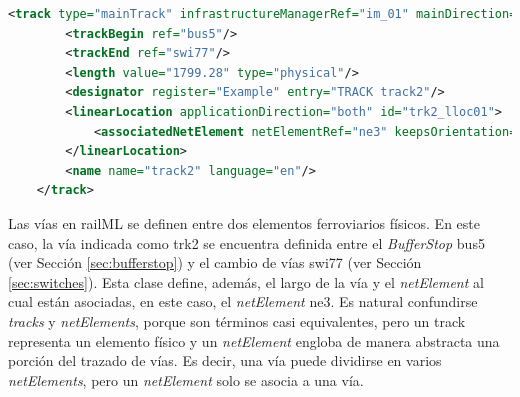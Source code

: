     \begin{lstlisting}[language = XML, caption = Clase \textit{Track} , label = {lst:track}]
    <track type="mainTrack" infrastructureManagerRef="im_01" mainDirection="both" id="trk2">
        <trackBegin ref="bus5"/>
        <trackEnd ref="swi77"/>
        <length value="1799.28" type="physical"/>
        <designator register="Example" entry="TRACK track2"/>
        <linearLocation applicationDirection="both" id="trk2_lloc01">
            <associatedNetElement netElementRef="ne3" keepsOrientation="true"/>
        </linearLocation>
        <name name="track2" language="en"/>
    </track>
    \end{lstlisting}
    
    Las vías en railML se definen entre dos elementos ferroviarios físicos. En este caso, la vía indicada como trk2 se encuentra definida entre el \textit{BufferStop} bus5 (ver Sección \ref{sec:bufferstop}) y el cambio de vías swi77 (ver Sección \ref{sec:switches}). Esta clase define, además, el largo de la vía y el \textit{netElement} al cual están asociadas, en este caso, el \textit{netElement} ne3. Es natural confundirse \textit{tracks} y \textit{netElements}, porque son términos casi equivalentes, pero un track representa un elemento físico y un \textit{netElement} engloba de manera abstracta una porción del trazado de vías. Es decir, una vía puede dividirse en varios \textit{netElements}, pero un \textit{netElement} solo se asocia a una vía.